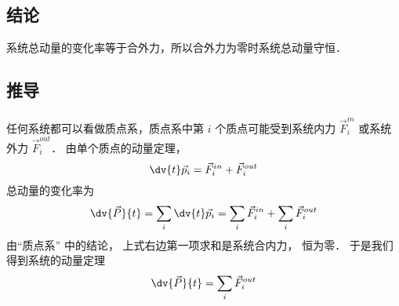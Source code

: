 
\subsection{结论}
系统总动量的变化率等于合外力，所以合外力为零时系统总动量守恒．

\subsection{推导}
任何系统都可以看做质点系，质点系中第 $i$ 个质点可能受到系统内力 $\vec F_i^{in}$ 或系统外力 $\vec F_i^{out}$． 由单个质点的动量定理，
\begin{equation}
\dv{t}\vec p_i = \vec F_i^{in} + \vec F_i^{out}
\end{equation}
总动量的变化率为
\begin{equation}
\dv{\vec P}{t} = \sum\limits_i {\dv{t} \vec p_i}  = \sum\limits_i {\vec F_i^{in}}  + \sum\limits_i {\vec F_i^{out}}
\end{equation}
由“质点系” 中的结论， 上式右边第一项求和是系统合内力， 恒为零． 于是我们得到系统的动量定理
\begin{equation}
\dv{\vec P}{t} = \sum\limits_i {\vec F_i^{out}} 
\end{equation}

